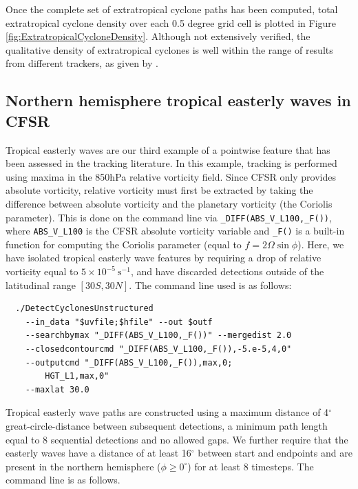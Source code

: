 \documentclass[gmdd, hvmath, online]{copernicus_discussions}
\begin{document}
Once the complete set of extratropical cyclone paths has been computed, total extratropical cyclone density over each 0.5 degree grid cell is plotted in Figure \ref{fig:ExtratropicalCycloneDensity}.  Although not extensively verified, the qualitative density of extratropical cyclones is well within the range of results from different trackers, as given by \cite{neu2013imilast}.

\subsection{Northern hemisphere tropical easterly waves in CFSR} \label{sec:TropicalEasterlyWavesExample}

Tropical easterly waves are our third example of a pointwise feature that has been assessed in the tracking literature.  In this example, tracking is performed using maxima in the 850hPa relative vorticity field.  Since CFSR only provides absolute vorticity, relative vorticity must first be extracted by taking the difference between absolute vorticity and the planetary vorticity (the Coriolis parameter).  This is done on the command line via \texttt{\_DIFF(ABS\_V\_L100,\_F())}, where \texttt{ABS\_V\_L100} is the CFSR absolute vorticity variable and \texttt{\_F()} is a built-in function for computing the Coriolis parameter (equal to $f = 2 \Omega \sin \phi$).  Here, we have isolated tropical easterly wave features by requiring a drop of relative vorticity equal to $5 \times 10^{-5}\ \mbox{s}^{-1}$, and have discarded detections outside of the latitudinal range $[30S, 30N]$.  The command line used is as follows:

{\small \begin{verbatim}
  ./DetectCyclonesUnstructured
    --in_data "$uvfile;$hfile" --out $outf
    --searchbymax "_DIFF(ABS_V_L100,_F())" --mergedist 2.0
    --closedcontourcmd "_DIFF(ABS_V_L100,_F()),-5.e-5,4,0"
    --outputcmd "_DIFF(ABS_V_L100,_F()),max,0;
        HGT_L1,max,0"
    --maxlat 30.0
\end{verbatim}}
    
Tropical easterly wave paths are constructed using a maximum distance of 4$^\circ$ great-circle-distance between subsequent detections, a minimum path length equal to 8 sequential detections and no allowed gaps.  We further require that the easterly waves have a distance of at least 16$^\circ$ between start and endpoints and are present in the northern hemisphere ($\phi \geq 0^\circ$) for at least 8 timesteps.  The command line is as follows.
\end{document}
